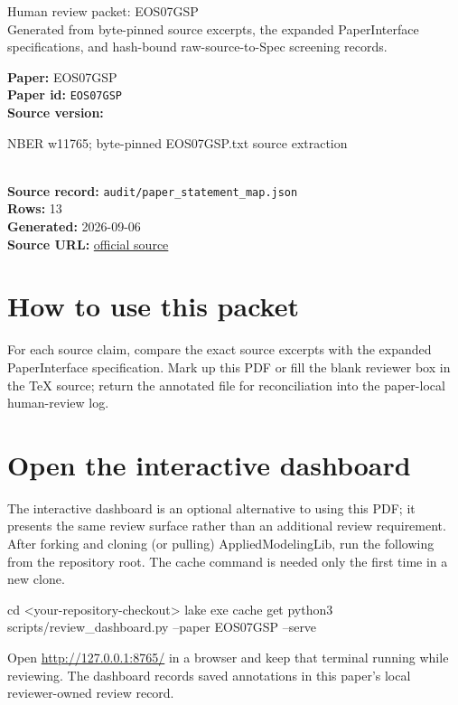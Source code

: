 \documentclass[10pt]{article}
\begin{document}
\fontsize{9}{10}\selectfont

\begin{center}
{\LARGE Human review packet: EOS07GSP}\\[0.35em]
\small Generated from byte-pinned source excerpts, the expanded PaperInterface
specifications, and hash-bound raw-source-to-Spec screening records.
\end{center}

\noindent\textbf{Paper:} EOS07GSP\\
\textbf{Paper id:} \texttt{EOS07GSP}\\
\textbf{Source version:} \parbox[t]{0.76\linewidth}{\raggedright NBER w11765; byte-pinned EOS07GSP.txt source extraction}\\
\textbf{Source record:} \texttt{audit/paper\_statement\_map.json}\\
\textbf{Rows:} 13\\
\textbf{Generated:} 2026-09-06\\
\textbf{Source URL:} \href{https://www.nber.org/papers/w11765}{official source}





\section*{How to use this packet}
For each source claim, compare the exact source excerpts with the expanded
PaperInterface specification. Mark up this PDF or fill the blank reviewer box in the TeX source;
return the annotated file for reconciliation into the paper-local human-review
log.

\section*{Open the interactive dashboard}
The interactive dashboard is an optional alternative to using this PDF; it
presents the same review surface rather than an additional review requirement.
After forking and cloning (or pulling) AppliedModelingLib, run the following from the
repository root. The cache command is needed only the first time in a new clone.
\begin{ReviewVerbatim}
cd <your-repository-checkout>
lake exe cache get
python3 scripts/review_dashboard.py --paper EOS07GSP --serve
\end{ReviewVerbatim}
Open \url{http://127.0.0.1:8765/} in a browser and keep that terminal running
while reviewing. The dashboard records saved annotations in this paper's local
reviewer-owned review record.
\end{document}
